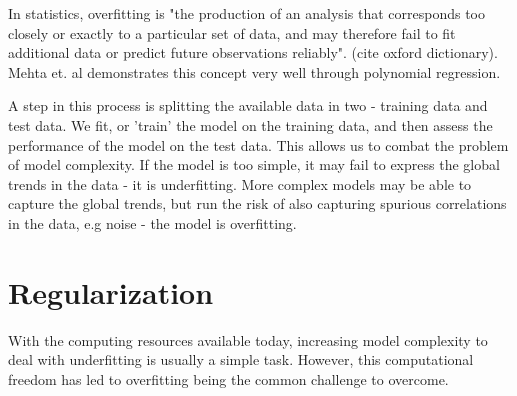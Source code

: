 In statistics, overfitting is "the production of an analysis that corresponds too closely or exactly to a 
particular set of data, and may therefore fail to fit additional data or predict future observations reliably".
(cite oxford dictionary). Mehta et. al \cite{Mehta2019} demonstrates this concept very well
through polynomial regression.

A step in this process is splitting the available data in two - training data and test data. We fit, or 'train'
the model on the training data, and then assess the performance of the model on the test data. This allows us
to combat the problem of model complexity. If the model is too simple, it may fail to express the global trends 
in the data - it is underfitting. More complex models may be able to capture the global trends, but run the risk of 
also capturing spurious correlations in the data, e.g noise - the model is overfitting.


\section{Regularization}\label{section:regularization}

With the computing resources available today, increasing model complexity to deal with underfitting is
usually a simple task. However, this computational freedom has led to overfitting being the common challenge
to overcome.


